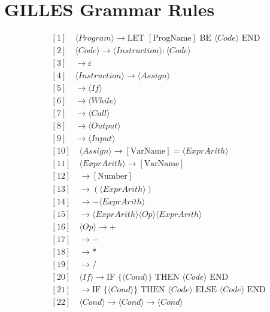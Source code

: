 \documentclass{article}
\begin{document}
	\section{GILLES Grammar Rules}

	\begin{align*}
		&[1] \quad \langle Program \rangle \rightarrow \text{LET } [\text{ProgName}] \text{ BE } \langle Code \rangle \text{ END} \\
		&[2] \quad \langle Code \rangle \rightarrow \langle Instruction \rangle : \langle Code \rangle \\
		&[3] \quad \rightarrow \varepsilon \\
		&[4] \quad \langle Instruction \rangle \rightarrow \langle Assign \rangle \\
		&[5] \quad \rightarrow \langle If \rangle \\
		&[6] \quad \rightarrow \langle While \rangle \\
		&[7] \quad \rightarrow \langle Call \rangle \\
		&[8] \quad \rightarrow \langle Output \rangle \\
		&[9] \quad \rightarrow \langle Input \rangle \\
		&[10] \quad \langle Assign \rangle \rightarrow [\text{VarName}] = \langle ExprArith \rangle \\
		&[11] \quad \langle ExprArith \rangle \rightarrow [\text{VarName}] \\
		&[12] \quad \rightarrow [\text{Number}] \\
		&[13] \quad \rightarrow ( \langle ExprArith \rangle ) \\
		&[14] \quad \rightarrow - \langle ExprArith \rangle \\
		&[15] \quad \rightarrow \langle ExprArith \rangle \langle Op \rangle \langle ExprArith \rangle \\
		&[16] \quad \langle Op \rangle \rightarrow + \\
		&[17] \quad \rightarrow - \\
		&[18] \quad \rightarrow * \\
		&[19] \quad \rightarrow / \\
		&[20] \quad \langle If \rangle \rightarrow \text{IF } \{ \langle Cond \rangle \} \text{ THEN } \langle Code \rangle \text{ END} \\
		&[21] \quad \rightarrow \text{IF } \{ \langle Cond \rangle \} \text{ THEN } \langle Code \rangle \text{ ELSE } \langle Code \rangle \text{ END} \\
		&[22] \quad \langle Cond \rangle \rightarrow \langle Cond \rangle \rightarrow \langle Cond \rangle \\

\end{align*}
\end{document}
